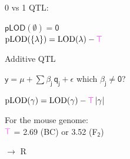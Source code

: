 \documentclass[12pt]{article}
\newcommand{\headsize}{\fontsize{35}{35} \selectfont}
\newcommand{\smallersize}{\fontsize{20}{25} \selectfont}
\newcommand{\lod}{\text{LOD}}
\newcommand{\plod}{\text{pLOD}}
\begin{document}
\vspace{2cm}

\hfill \begin{minipage}[t]{1.4in}
\vspace*{0mm}

0 vs 1 QTL:
\end{minipage}
\begin{minipage}[t]{8.6in}
\vspace*{0mm}

\color{myblue}
$\mathsf{\plod(\emptyset) = 0}$ \\[16pt]
$\mathsf{\plod(\{\lambda\}) =
    \lod(\lambda) - {\color{mypink} T}}$
\end{minipage}

\newpage


\headsize \color{myyellow}
\hfill \begin{minipage}{5.75in}
\centering
Additive QTL
\end{minipage}

\vspace{6cm}

\color{mywhite} \smallersize

\hfill \begin{minipage}{10in}

\centerline{
$\mathsf{y  = \mu + \sum \beta_j \, q_j + \epsilon}$ \hspace{1cm}
       {\color{mypink} which $\mathsf{\beta_j \ne 0}$?}
}

\vspace{3cm}

{\color{myyellow}
$\mathsf{ \plod(\gamma) = \lod(\gamma) -
    {\color{mypink} T} \, |\gamma| }$
}


\end{minipage}

\vspace{2cm}

\hfill \begin{minipage}[t]{10in}
\vspace*{0mm}


For the mouse genome: \\[6pt]
\hspace*{0.5in} $\mathsf{\color{mypink} T}$ = {\color{myblue}
  2.69} (BC) or {\color{myblue} 3.52} (F$_{\mathsf{2}}$)
\end{minipage}



\newpage

\headsize \color{myyellow}
$\boldsymbol{\rightarrow}$ R
\end{document}
